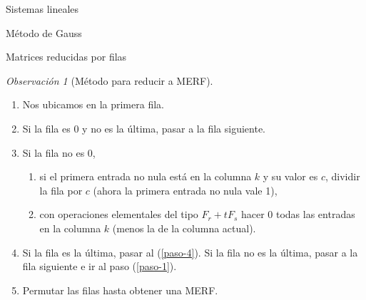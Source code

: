 \documentclass[a4paper,12pt,twoside,spanish,reqno]{amsbook}
\numberwithin{equation}{section}
\theoremstyle{definition}
\theoremstyle{remark}
\newtheorem{observacion}[teorema]{Observaci\'on}
\begin{document}
\begin{chapter}{Sistemas lineales}
\begin{section}{Método de Gauss }
\begin{subsection}{Matrices reducidas por filas}
\begin{observacion}[\sc Método para reducir a MERF]
                \begin{enumerate}
                    \item \label{paso-0} Nos ubicamos en la primera fila.
                    \item \label{paso-1} Si la fila es 0 y no es la última, pasar a la fila siguiente.
                    \item \label{paso-2} Si la fila no es 0, 
                    \begin{enumerate}
                        \item si el primera entrada no nula está en  la columna $k$ y su valor es $c$, dividir la fila por $c$ (ahora la primera entrada no nula vale 1),
                        \item con operaciones elementales del tipo $F_r+ tF_s$ hacer 0  todas las entradas en la columna $k$ (menos la de la columna actual).    
                    \end{enumerate}
                    \item \label{paso-3} Si la fila es la última, pasar al (\ref{paso-4}). Si la fila no es la última, pasar a la fila siguiente e ir al paso (\ref{paso-1}).  
                    \item \label{paso-4} Permutar las filas hasta obtener una MERF. 
                \end{enumerate}
            \end{observacion}
                

\end{subsection}
\end{section}
\end{chapter}
\end{document}
